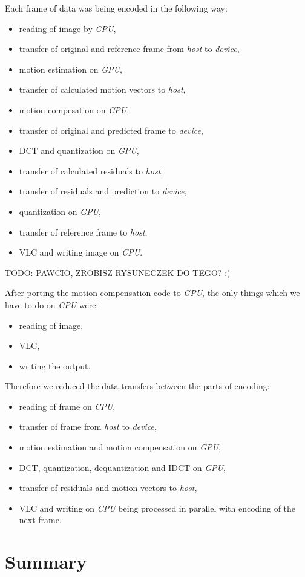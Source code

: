 \documentclass[11pt]{article}
\begin{document}
Each frame of data was being encoded in the following way:
\begin{itemize}
  \item reading of image by \emph{CPU},
  \item transfer of original and reference frame from \emph{host} to 
  \emph{device},
  \item motion estimation on \emph{GPU},
  \item transfer of calculated motion vectors to \emph{host},
  \item motion compesation on \emph{CPU},
  \item transfer of original and predicted frame to \emph{device},
  \item DCT and quantization on \emph{GPU},
  \item transfer of calculated residuals to \emph{host},
  \item transfer of residuals and prediction to \emph{device},
  \item quantization on \emph{GPU},
  \item transfer of reference frame to \emph{host},
  \item VLC and writing image on \emph{CPU}.
\end{itemize}
TODO: PAWCIO, ZROBISZ RYSUNECZEK DO TEGO? :)

After porting the motion compensation code to \emph{GPU}, the only things
which we have to do on \emph{CPU} were:
\begin{itemize}
  \item reading of image,
  \item VLC,
  \item writing the output.
\end{itemize}
Therefore we reduced the data transfers between the parts of encoding:
\begin{itemize}
  \item reading of frame on \emph{CPU},
  \item transfer of frame from \emph{host} to \emph{device},
  \item motion estimation and motion compensation on \emph{GPU},
  \item DCT, quantization, dequantization and IDCT on \emph{GPU},
  \item transfer of residuals and motion vectors to \emph{host},
  \item VLC and writing on \emph{CPU} being processed in parallel with
  encoding of the next frame.
\end{itemize}

\section{Summary}
\end{document}
